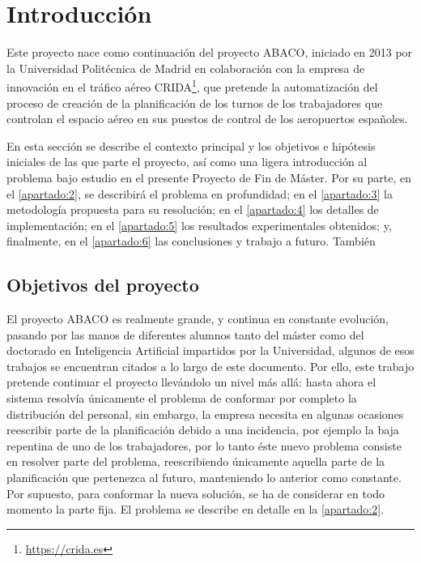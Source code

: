 \graphicspath{{capitulos/Capitulo1-Introduccion/recursos/}}


\section{Introducción}

Este proyecto nace como continuación del proyecto ABACO, iniciado en 2013 por la Universidad Politécnica de Madrid en
colaboración con la empresa de innovación en el tráfico aéreo CRIDA\footnote{\url{https://crida.es}}, que pretende la
automatización del proceso de creación de la planificación de los turnos de los trabajadores que controlan el espacio 
aéreo en sus puestos de control de los aeropuertos españoles.

En esta sección se describe el contexto principal y los objetivos e hipótesis iniciales de las que parte el proyecto, 
así como una ligera introducción al problema bajo estudio en el presente Proyecto de Fin de Máster. Por su parte, en el 
\autoref{apartado:2}, se describirá el problema en profundidad; en el \autoref{apartado:3}
la metodología propuesta para su resolución; en el \autoref{apartado:4} los detalles de implementación;
en el \autoref{apartado:5} los resultados experimentales obtenidos; y, finalmente, en el \autoref{apartado:6} las 
conclusiones y trabajo a futuro. También  %

\subsection{Objetivos del proyecto}
\label{sec:Objectivos}
El proyecto \gls{ABACO} es realmente grande, y continua en constante evolución, pasando por las manos de 
diferentes alumnos tanto del máster como del doctorado en Inteligencia Artificial impartidos por la Universidad, algunos de esos trabajos se encuentran citados a lo largo de este documento. 
Por ello, este trabajo pretende continuar el proyecto llevándolo un nivel más allá: hasta ahora el sistema resolvía únicamente el problema de conformar por completo la distribución del personal, sin embargo, la empresa necesita en algunas ocasiones reescribir parte de la planificación debido a una incidencia, por ejemplo la baja repentina de uno de los trabajadores, por lo tanto éste nuevo problema consiste en resolver parte del problema, reescribiendo únicamente aquella parte de la planificación que pertenezca al futuro, manteniendo lo anterior como constante. 
Por supuesto, para conformar la nueva solución, se ha de considerar en todo momento la parte fija. El problema se describe en detalle en la \autoref{apartado:2}.

